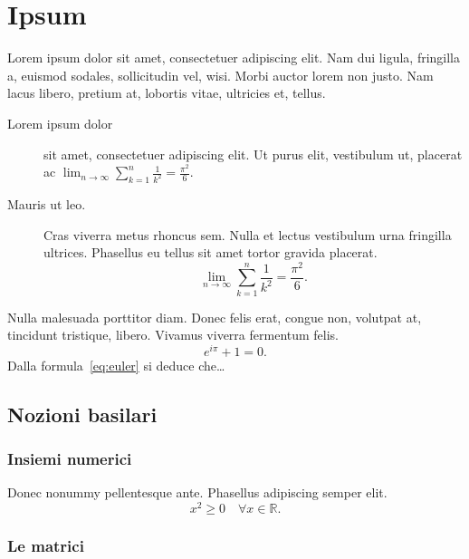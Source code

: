 
\chapter{Ipsum}
\label{cap:ipsum}


Lorem ipsum dolor sit amet, consectetuer adipiscing elit. Nam dui ligula, fringilla a, euismod sodales, sollicitudin vel, wisi. Morbi auctor lorem non justo. Nam lacus libero, pretium at, lobortis vitae, ultricies et, tellus.
\begin{description}
\item[Lorem ipsum dolor] sit amet, consectetuer adipiscing elit. Ut purus elit, vestibulum ut, placerat ac $\lim_{n \to \infty}\sum_{k=1}^n \frac{1}{k^2}= \frac{\pi^2}{6}$.
\item[Mauris ut leo.]
Cras viverra metus rhoncus sem. Nulla et lectus vestibulum urna fringilla ultrices. Phasellus eu tellus sit amet tortor gravida placerat.
\[
\lim_{n \to \infty}\sum_{k=1}^n \frac{1}{k^2}= \frac{\pi^2}{6}.
\]
\end{description}

Nulla malesuada porttitor diam. Donec felis erat, congue non, volutpat at, tincidunt tristique, libero. Vivamus viverra fermentum felis.
\begin{equation}
\label{eq:euler}
e^{i\pi}+1=0.
\end{equation}
Dalla formula~\eqref{eq:euler} 
si deduce che\dots






\section{Nozioni basilari}

\subsection{Insiemi numerici}

Donec nonummy pellentesque ante. Phasellus adipiscing semper elit.
\begin{equation}
x^2 \geq 0 \quad
\forall x \in \mathbb{R}.
\end{equation}


\subsection{Le matrici}

